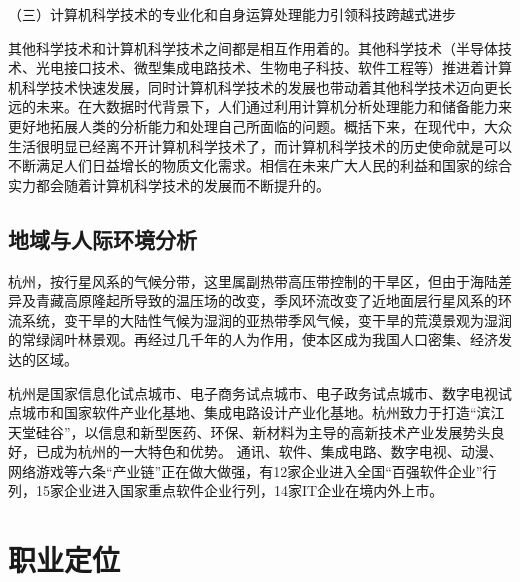 \documentclass{article}
\begin{document}
（三）计算机科学技术的专业化和自身运算处理能力引领科技跨越式进步\par
其他科学技术和计算机科学技术之间都是相互作用着的。其他科学技术（半导体技术、光电接口技术、微型集成电路技术、生物电子科技、软件工程等）推进着计算机科学技术快速发展，同时计算机科学技术的发展也带动着其他科学技术迈向更长远的未来。在大数据时代背景下，人们通过利用计算机分析处理能力和储备能力来更好地拓展人类的分析能力和处理自己所面临的问题。概括下来，在现代中，大众生活很明显已经离不开计算机科学技术了，而计算机科学技术的历史使命就是可以不断满足人们日益增长的物质文化需求。相信在未来广大人民的利益和国家的综合实力都会随着计算机科学技术的发展而不断提升的。\par
\subsection{地域与人际环境分析}
杭州，按行星风系的气候分带，这里属副热带高压带控制的干旱区，但由于海陆差异及青藏高原隆起所导致的温压场的改变，季风环流改变了近地面层行星风系的环流系统，变干旱的大陆性气候为湿润的亚热带季风气候，变干旱的荒漠景观为湿润的常绿阔叶林景观。再经过几千年的人为作用，使本区成为我国人口密集、经济发达的区域。\par
杭州是国家信息化试点城市、电子商务试点城市、电子政务试点城市、数字电视试点城市和国家软件产业化基地、集成电路设计产业化基地。杭州致力于打造“滨江天堂硅谷”，以信息和新型医药、环保、新材料为主导的高新技术产业发展势头良好，已成为杭州的一大特色和优势。 通讯、软件、集成电路、数字电视、动漫、网络游戏等六条“产业链”正在做大做强，有12家企业进入全国“百强软件企业”行列，15家企业进入国家重点软件企业行列，14家IT企业在境内外上市。\par

\section{职业定位}
\par
\end{document}
